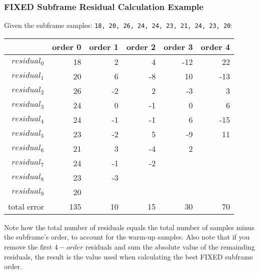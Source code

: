 \subsubsection{FIXED Subframe Residual Calculation Example}

Given the subframe samples: \texttt{18, 20, 26, 24, 24, 23, 21, 24, 23, 20}:
\begin{table}[h]
{
\begin{tabular}{r|r|r|r|r|r}
& order 0 & order 1 & order 2 & order 3 & order 4 \\
\hline
$residual_0$ & 18 & 2 & 4 & -12 & 22 \\
$residual_1$ & 20 & 6 & -8 & 10 & -13 \\
$residual_2$ & 26 & -2 & 2 & -3 & 3 \\
$residual_3$ & 24 & 0 & -1 & 0 & 6 \\
$residual_4$ & 24 & -1 & -1 & 6 & -15 \\
$residual_5$ & 23 & -2 & 5 & -9 & 11 \\
$residual_6$ & 21 & 3 & -4 & 2 \\
$residual_7$ & 24 & -1 & -2 \\
$residual_8$ & 23 & -3 \\
$residual_9$ & 20 \\
\hline
total error & 135 & 10 & 15 & 30 & 70 \\
\end{tabular}
}
\end{table}
\par
\noindent
Note how the total number of residuals equals the
total number of samples minus the subframe's order,
to account for the warm-up samples.
Also note that if you remove the first $4 - order$ residuals
and sum the absolute value of the remainding residuals,
the result is the  value
used when calculating the best FIXED subframe order.

